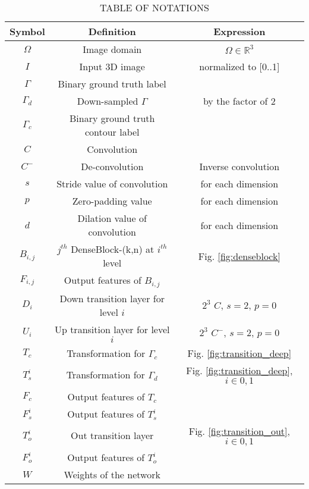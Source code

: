 \documentclass[journal]{IEEEtran}
\begin{document}
\begin{table}[!t]%
\renewcommand{\arraystretch}{1.5}
\caption{TABLE OF NOTATIONS}
\label{table:symbols}
\centering
\begin{tabular}{c||c||c}
Symbol & Definition & Expression\\
\hline
\(\Omega\) & Image domain & \(\Omega\in\mathbb{R}^3\)\\
\(I\) & Input 3D image & normalized to [0..1]\\
\(\Gamma\) & Binary ground truth label & \\
\(\Gamma_d\) & Down-sampled \(\Gamma\) & by the factor of 2\\
\(\Gamma_c\) & Binary ground truth contour label & \\
\(C\) & Convolution & \\
\(C^-\) & De-convolution & Inverse convolution \\
\(s\) & Stride value of convolution & for each dimension\\
\(p\) & Zero-padding value & for each dimension\\
\(d\) & Dilation value of convolution & for each dimension\\
\(B_{i,j}\) & \(j^{th}\) DenseBlock-(k,n) at \(i^{th}\) level & Fig. \ref{fig:denseblock}\\
\(F_{i,j}\) & Output features of \(B_{i,j}\) & \\
\(D_i\) & Down transition layer for level \(i\) & \(2^3\) \(C\), \(s=2\), \(p=0\)\\
\(U_i\) & Up transition layer for level \(i\) & \(2^3\) \(C^-\), \(s=2\), \(p=0\)\\
\(T_c\) & Transformation for \(\Gamma_c\) & Fig. \ref{fig:transition_deep}\\
\(T^i_s\) & Transformation for \(\Gamma_d\) & Fig. \ref{fig:transition_deep}, \(i\in{0,1}\)\\
\(F_c\) & Output features of \(T_c\) & \\
\(F^i_s\) & Output features of \(T^i_s\) & \\
\(T^i_o\) & Out transition layer & Fig. \ref{fig:transition_out}, \(i\in{0,1}\)\\
\(F^i_o\) & Output features of \(T^i_o\) & \\
\(W\) & Weights of the network & \\
\end{tabular}
\end{table}
\end{document}

